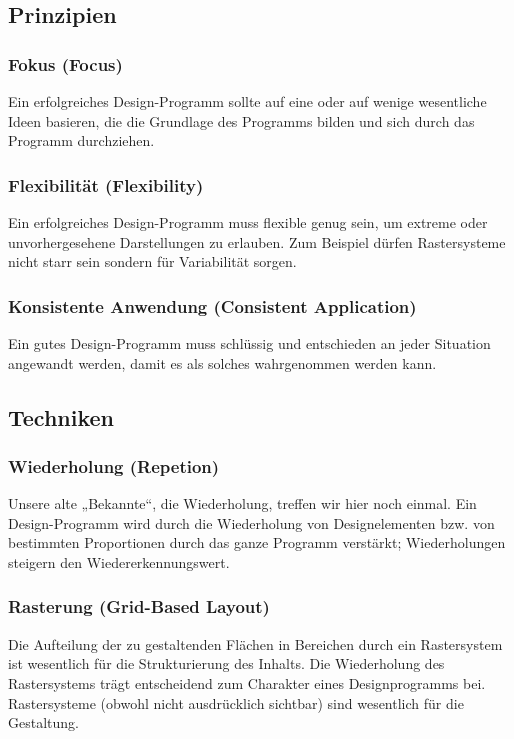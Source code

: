 \subsection{Prinzipien}
\subsubsection*{Fokus (Focus)}
Ein erfolgreiches Design-Programm sollte auf eine oder auf wenige wesentliche Ideen basieren, die die Grundlage des Programms bilden und sich durch das Programm durchziehen. 

\subsubsection*{Flexibilität (Flexibility)}
Ein erfolgreiches Design-Programm muss flexible genug sein, um extreme oder unvorhergesehene Darstellungen zu erlauben. Zum Beispiel dürfen Rastersysteme nicht starr sein sondern für Variabilität sorgen.  

\subsubsection*{Konsistente Anwendung (Consistent Application)}
Ein gutes Design-Programm muss schlüssig und entschieden an jeder Situation angewandt werden, damit es als solches wahrgenommen werden kann. 

\subsection{Techniken}
\subsubsection*{Wiederholung (Repetion)}
Unsere alte „Bekannte“, die Wiederholung, treffen wir hier noch einmal. Ein Design-Programm wird durch die Wiederholung von Designelementen bzw. von bestimmten Proportionen durch das ganze Programm verstärkt; Wiederholungen steigern den Wiedererkennungswert.
 
\subsubsection*{Rasterung (Grid-Based Layout)}
Die Aufteilung der zu gestaltenden Flächen in Bereichen durch ein Rastersystem ist wesentlich für die Strukturierung des Inhalts. Die Wiederholung des Rastersystems trägt entscheidend zum Charakter eines Designprogramms bei. Rastersysteme (obwohl nicht ausdrücklich sichtbar) sind wesentlich für die Gestaltung.

